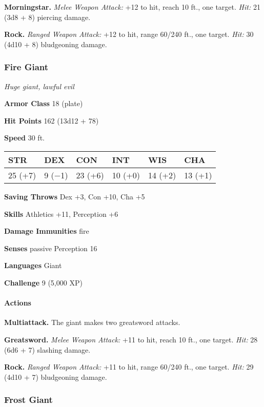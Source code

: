 \documentclass[
]{article}
\begin{document}
\textbf{Morningstar.} \emph{Melee Weapon Attack:} +12 to hit, reach 10
ft., one target. \emph{Hit:} 21 (3d8 + 8) piercing damage.

\textbf{Rock.} \emph{Ranged Weapon Attack:} +12 to hit, range 60/240
ft., one target. \emph{Hit:} 30 (4d10 + 8) bludgeoning damage.

\hypertarget{fire-giant}{%
\subsubsection{Fire Giant}\label{fire-giant}}

\emph{Huge giant, lawful evil}

\textbf{Armor Class} 18 (plate)

\textbf{Hit Points} 162 (13d12 + 78)

\textbf{Speed} 30 ft.

\begin{longtable}[]{@{}llllll@{}}
\toprule
STR & DEX & CON & INT & WIS & CHA\tabularnewline
\midrule
\endhead
25 (+7) & 9 (−1) & 23 (+6) & 10 (+0) & 14 (+2) & 13 (+1)\tabularnewline
\bottomrule
\end{longtable}

\textbf{Saving Throws} Dex +3, Con +10, Cha +5

\textbf{Skills} Athletics +11, Perception +6

\textbf{Damage Immunities} fire

\textbf{Senses} passive Perception 16

\textbf{Languages} Giant

\textbf{Challenge} 9 (5,000 XP)

\hypertarget{actions-7}{%
\paragraph{Actions}\label{actions-7}}

\textbf{Multiattack.} The giant makes two greatsword attacks.

\textbf{Greatsword.} \emph{Melee Weapon Attack:} +11 to hit, reach 10
ft., one target. \emph{Hit:} 28 (6d6 + 7) slashing damage.

\textbf{Rock.} \emph{Ranged Weapon Attack:} +11 to hit, range 60/240
ft., one target. \emph{Hit:} 29 (4d10 + 7) bludgeoning damage.

\hypertarget{frost-giant}{%
\subsubsection{Frost Giant}\label{frost-giant}}
\end{document}
